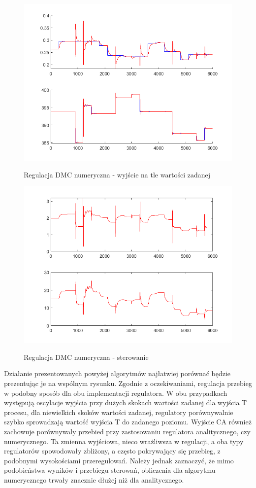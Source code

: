 \begin{figure}[h!]
	\centering
	\includegraphics[width=.6\linewidth]{img/yDMCnum.png}
	\label{ch2:Zadanie}
	\caption{Regulacja DMC numeryczna - wyjście na tle wartości zadanej}
\end{figure}
\begin{figure}[h!]
	\centering
	\includegraphics[width=.6\linewidth]{img/uDMCnum.png}
	\label{ch2:Zadanie}
	\caption{Regulacja DMC numeryczna - sterowanie}
\end{figure}
\newpage
Działanie prezentowanych powyżej algorytmów najłatwiej porównać będzie prezentując je na wspólnym rysunku. 
Zgodnie z oczekiwaniami, regulacja przebieg w podobny sposób dla obu implementacji regulatora. W obu przypadkach występują oscylacje wyjścia przy dużych skokach wartości zadanej dla wyjścia T procesu, dla niewielkich skoków wartości zadanej, regulatory porównywalnie szybko sprowadzają wartość wyjścia T do zadanego poziomu. Wyjście CA również zachowuje porównywaly przebied przy zastosowaniu regulatora analitycznego, czy numerycznego. Ta zmienna wyjściowa, nieco wrażliwsza w regulacji, a oba typy regulatorów spowodowały zbliżony, a często pokrywający się przebieg, z podobnymi wysokościami przeregulowań.
Należy jednak zaznaczyć, że mimo podobieństwa wyników i przebiegu sterowań, obliczenia dla algorytmu numerycznego trwały znacznie dłużej niż dla analitycznego.
